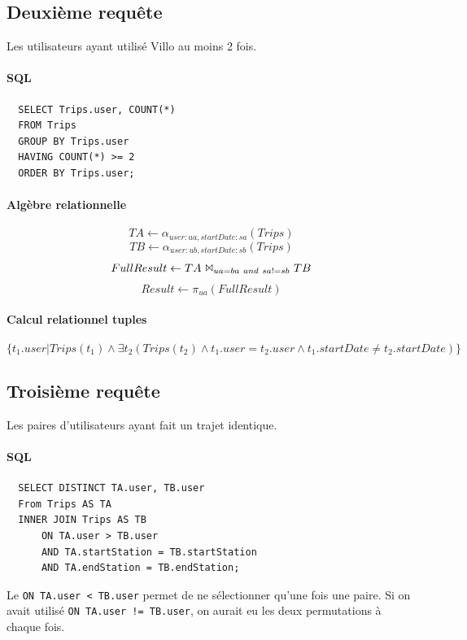 \documentclass[a4paper]{article}
\begin{document}
\subsection{Deuxième requête}
    Les utilisateurs ayant utilisé Villo au moins 2 fois.

    \paragraph{SQL}
  \begin{verbatim}
  SELECT Trips.user, COUNT(*)
  FROM Trips
  GROUP BY Trips.user
  HAVING COUNT(*) >= 2
  ORDER BY Trips.user;
  \end{verbatim}
  
  \paragraph{Algèbre relationnelle}
  $$ TA \leftarrow \alpha_{user:ua, startDate:sa}(Trips) $$
  $$ TB \leftarrow \alpha_{user:ub, startDate:sb}(Trips) $$
  $$FullResult \leftarrow TA\ \Bowtie_{ua=ba\ and\ sa!=sb}\ TB $$
  $$Result \leftarrow \pi_{ua}(FullResult)$$
  
  \paragraph{Calcul relationnel tuples}
  $$ \{ t_1.user | Trips(t_1) \land \exists t_2 (Trips(t_2) \land t_1.user = t_2.user \land t_1.startDate \neq t_2.startDate)\} $$
  


\subsection{Troisième requête}
    Les paires d'utilisateurs ayant fait un trajet identique.

    \paragraph{SQL}
  \begin{verbatim}
  SELECT DISTINCT TA.user, TB.user
  From Trips AS TA
  INNER JOIN Trips AS TB 
      ON TA.user > TB.user 
      AND TA.startStation = TB.startStation 
      AND TA.endStation = TB.endStation;
  \end{verbatim}
    Le \texttt{ON TA.user < TB.user} permet de ne sélectionner qu'une fois une paire. Si on avait utilisé \texttt{ON TA.user != TB.user}, on aurait eu les deux permutations à chaque fois.
    
\end{document}
